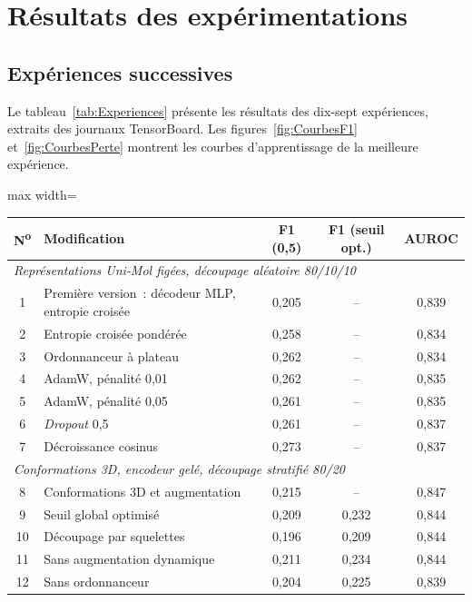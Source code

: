 \section{Résultats des expérimentations}
\label{sec:Resultats}

\subsection{Expériences successives}

Le tableau~\ref{tab:Experiences} présente les résultats des dix-sept expériences, extraits des journaux TensorBoard.
Les figures~\ref{fig:CourbesF1} et~\ref{fig:CourbesPerte} montrent les courbes d'apprentissage de la meilleure expérience.

\begin{table}
   \centering
   \begin{adjustbox}{max width=\linewidth}
   \begin{tabular}{|c|l||c|c|c|}
      \hline
      N\textsuperscript{o} & Modification & F1 (0,5) & F1 (seuil opt.) & AUROC \\
      \hline
      \hline
      \multicolumn{5}{|l|}{\emph{Représentations Uni-Mol figées, découpage aléatoire 80/10/10}} \\
      \hline
      1 & Première version~: décodeur MLP, entropie croisée & 0,205 & -- & 0,839 \\
      2 & Entropie croisée pondérée & 0,258 & -- & 0,834 \\
      3 & Ordonnanceur à plateau & 0,262 & -- & 0,834 \\
      4 & AdamW, pénalité 0,01 & 0,262 & -- & 0,835 \\
      5 & AdamW, pénalité 0,05 & 0,261 & -- & 0,835 \\
      6 & \emph{Dropout} 0,5 & 0,261 & -- & 0,837 \\
      7 & Décroissance cosinus & 0,273 & -- & 0,837 \\
      \hline
      \multicolumn{5}{|l|}{\emph{Conformations 3D, encodeur gelé, découpage stratifié 80/20}} \\
      \hline
      8 & Conformations 3D et augmentation & 0,215 & -- & 0,847 \\
      9 & Seuil global optimisé & 0,209 & 0,232 & 0,844 \\
      10 & Découpage par squelettes & 0,196 & 0,209 & 0,844 \\
      11 & Sans augmentation dynamique & 0,211 & 0,234 & 0,844 \\
      12 & Sans ordonnanceur & 0,204 & 0,225 & 0,839 \\

\end{tabular}
\end{adjustbox}
\end{table}
